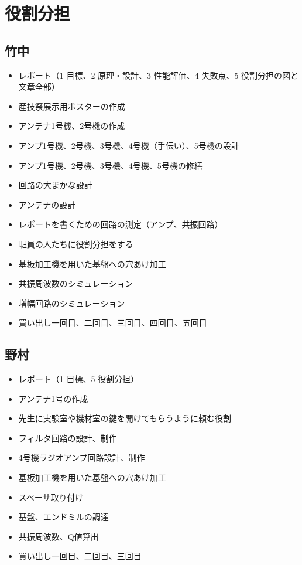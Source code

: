 \documentclass[report.tex]{subfiles}
\begin{document}
\section{役割分担}

\subsection{竹中}

\begin{itemize}
	\item レポート（1 目標、2 原理・設計、3 性能評価、4 失敗点、5 役割分担の図と文章全部）
	\item 産技祭展示用ポスターの作成
	\item アンテナ1号機、2号機の作成
	\item アンプ1号機、2号機、3号機、4号機（手伝い）、5号機の設計
	\item アンプ1号機、2号機、3号機、4号機、5号機の修繕
	\item 回路の大まかな設計
	\item アンテナの設計
	\item レポートを書くための回路の測定（アンプ、共振回路）
	\item 班員の人たちに役割分担をする
	\item 基板加工機を用いた基盤への穴あけ加工
	\item 共振周波数のシミュレーション
	\item 増幅回路のシミュレーション
	\item 買い出し一回目、二回目、三回目、四回目、五回目
\end{itemize}

\subsection{野村}

\begin{itemize}
	\item レポート（1 目標、5 役割分担）
	\item アンテナ1号の作成
	\item 先生に実験室や機材室の鍵を開けてもらうように頼む役割
	\item フィルタ回路の設計、制作
	\item 4号機ラジオアンプ回路設計、制作
	\item 基板加工機を用いた基盤への穴あけ加工
	\item スペーサ取り付け
	\item 基盤、エンドミルの調達
	\item 共振周波数、Q値算出
	\item 買い出し一回目、二回目、三回目
\end{itemize}
\end{document}
